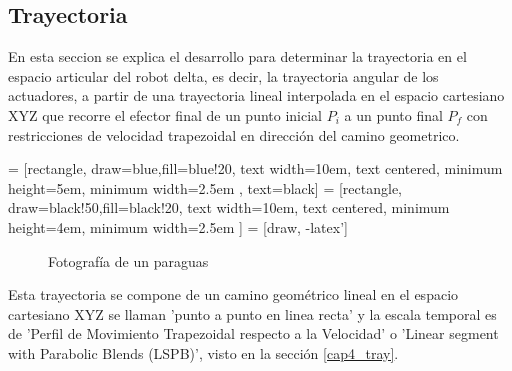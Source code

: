     \newpage

    \subsection{Trayectoria}
    
    En esta seccion se explica el desarrollo para determinar la trayectoria en el espacio articular del robot delta, es decir, la trayectoria angular de los actuadores, a partir de una trayectoria lineal interpolada en el espacio cartesiano XYZ que recorre el efector final de un punto inicial $P_i$ a un punto final $P_f$ con restricciones de velocidad trapezoidal en dirección del camino geometrico.

         = [rectangle, draw=blue,fill=blue!20, text width=10em, text centered, minimum height=5em, minimum width=2.5em , text=black]
         = [rectangle, draw=black!50,fill=black!20, text width=10em, text centered, minimum height=4em, minimum width=2.5em ]
         = [draw, -latex']
         \begin{center}
         \begin{figure}[htb]
                \caption{Fotografía de un paraguas}
                \label{f:cap6_trayectory_1}
         \end{figure}
         \end{center}
         
        \vspace{-1cm}   

        
    Esta trayectoria se compone de un camino geométrico lineal en el espacio cartesiano XYZ se llaman 'punto a punto en linea recta' y la escala temporal es de 'Perfil de Movimiento Trapezoidal respecto a la Velocidad' o 'Linear segment with Parabolic Blends (LSPB)', visto en la sección \ref{cap4_tray}. 
    
